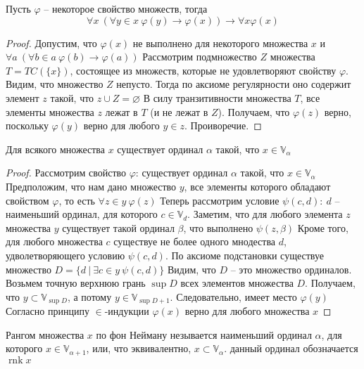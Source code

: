 \begin{theo}[$\in$-индукция]
Пусть $\varphi$ -- некоторое свойство множеств, тогда
$$
\forall x\ (\forall y \in x\ \varphi(y) \to \varphi(x)) \to \forall x \varphi(x)
$$
\end{theo}
\begin{proof}
Допустим, что $\varphi(x)$ не выполнено для некоторого множества $x$ и $\forall a\ (\forall b \in a\ \varphi(b) \to \varphi(a))$
\vskip 0.1in
Рассмотрим подмножество $Z$ множества $T = TC(\{x\})$, состоящее из множеств, которые не удовлетворяют свойству $\varphi$.
\vskip 0.1in
Видим, что множество $Z$ непусто. Тогда по аксиоме регулярности оно содержит элемент $z$ такой, что $z \cup Z = \varnothing$
\vskip 0.1in
В силу транзитивности множества $T$, все элементы множества $z$ лежат в $T$ (и не лежат в $Z$). Получаем, что $\varphi(z)$ верно, поскольку $\varphi(y)$ верно для любого $y \in z$. Проиворечие.
\end{proof}

\begin{theo}
Для всякого множества $x$ существует ординал $\alpha$ такой, что $x \in \mathbb{V}_{\alpha}$
\end{theo}
\begin{proof}
Рассмотрим свойство $\varphi$: существует ординал $\alpha$ такой, что $x \in \mathbb{V}_{\alpha}$
\vskip 0.1in
Предположим, что нам дано множество $y$, все элементы которого обладают свойством $\varphi$, то есть $\forall z \in y\ \varphi(z)$
\vskip 0.1in
Теперь рассмотрим условие $\psi(c,d):\ d$ -- наименьший ординал, для которого $c \in \mathbb{V}_{d}$. Заметим, что для любого элемента $z$ множества $y$ существует такой ординал $\beta$, что выполнено $\psi(z, \beta)$
\vskip 0.1in
Кроме того, для любого множества $c$ существуе не более одного мнодества $d$, удволетворяющего условию $\psi(c,d)$. По аксиоме подстановки существуе множество $D = \{d\ |\ \exists c \in y\ \psi(c,d)\}$
\vskip 0.1in
Видим, что $D$ -- это множество ординалов. Возьмем точную верхнюю грань $\sup D$ всех элементов множества $D$. Получаем, что $y \subset \mathbb{V}_{\sup D}$, а потому $y \in \mathbb{V}_{\sup D+1}$. Следовательно, имеет место $\varphi(y)$
\vskip 0.1in
Согласно принципу $\in$-индукции $\varphi(x)$ верно для любого множества $x$
\end{proof}

\begin{defn}
Рангом множества $x$ по фон Нейману незывается наименьший ординал $\alpha$, для которого $x \in \mathbb{V}_{\alpha + 1}$, или, что эквивалентно, $x \subset \mathbb{V}_{\alpha}$.
данный ординал обозначается $\operatorname{rnk} x$
\end{defn}

